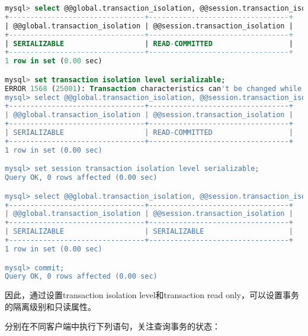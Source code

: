 \documentclass{article}
\begin{document}
\begin{lstlisting}[language=sql]
mysql> select @@global.transaction_isolation, @@session.transaction_isolation;
+--------------------------------+---------------------------------+
| @@global.transaction_isolation | @@session.transaction_isolation |
+--------------------------------+---------------------------------+
| SERIALIZABLE                   | READ-COMMITTED                  |
+--------------------------------+---------------------------------+
1 row in set (0.00 sec)

mysql> set transaction isolation level serializable;
ERROR 1568 (25001): Transaction characteristics can't be changed while a transaction is in progress
mysql> select @@global.transaction_isolation, @@session.transaction_isolation;
+--------------------------------+---------------------------------+
| @@global.transaction_isolation | @@session.transaction_isolation |
+--------------------------------+---------------------------------+
| SERIALIZABLE                   | READ-COMMITTED                  |
+--------------------------------+---------------------------------+
1 row in set (0.00 sec)

mysql> set session transaction isolation level serializable;
Query OK, 0 rows affected (0.00 sec)

mysql> select @@global.transaction_isolation, @@session.transaction_isolation;
+--------------------------------+---------------------------------+
| @@global.transaction_isolation | @@session.transaction_isolation |
+--------------------------------+---------------------------------+
| SERIALIZABLE                   | SERIALIZABLE                    |
+--------------------------------+---------------------------------+
1 row in set (0.00 sec)

mysql> commit;
Query OK, 0 rows affected (0.00 sec)
\end{lstlisting}

因此，通过设置transaction isolation level和transaction read only，可以设置事务的隔离级别和只读属性。

分别在不同客户端中执行下列语句，关注查询事务的状态：
\end{document}
